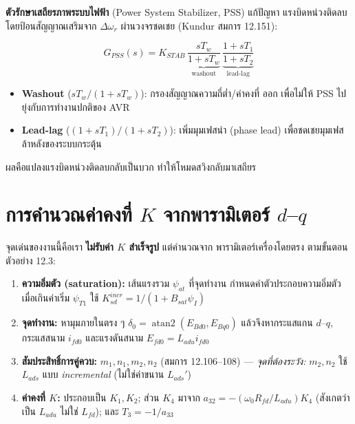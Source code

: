 \documentclass[12pt,a4paper]{article}
\newcommand{\dwr}{\Delta\omega_r}
\begin{document}
\textbf{ตัวรักษาเสถียรภาพระบบไฟฟ้า} (Power System Stabilizer, PSS) แก้ปัญหา
แรงบิดหน่วงติดลบ โดยป้อนสัญญาณเสริมจาก $\dwr$ ผ่านวงจรชดเชย (Kundur
สมการ 12.151):

\begin{equation}
G_{PSS}(s) = K_{STAB}\,
\underbrace{\frac{sT_w}{1+sT_w}}_{\text{washout}}\,
\underbrace{\frac{1+sT_1}{1+sT_2}}_{\text{lead-lag}}
\end{equation}

\begin{itemize}
  \item \textbf{Washout} ($sT_w/(1+sT_w)$): กรองสัญญาณความถี่ต่ำ/ค่าคงที่
        ออก เพื่อไม่ให้ PSS ไปยุ่งกับการทำงานปกติของ AVR
  \item \textbf{Lead-lag} ($(1+sT_1)/(1+sT_2)$): เพิ่มมุมเฟสนำ (phase lead)
        เพื่อชดเชยมุมเฟสล้าหลังของระบบกระตุ้น
\end{itemize}

ผลคือแปลงแรงบิดหน่วงติดลบกลับเป็นบวก ทำให้โหมดสวิงกลับมาเสถียร

\section{การคำนวณค่าคงที่ $K$ จากพารามิเตอร์ $d$--$q$}
\label{sec:kderiv}

จุดเด่นของงานนี้คือเรา \textbf{ไม่รับค่า $K$ สำเร็จรูป} แต่คำนวณจาก
พารามิเตอร์เครื่องโดยตรง ตามขั้นตอนตัวอย่าง 12.3:

\begin{enumerate}
  \item \textbf{ความอิ่มตัว (saturation):} เส้นแรงรวม $\psi_{at}$ ที่จุดทำงาน
        กำหนดค่าตัวประกอบความอิ่มตัว เมื่อเกินค่าเริ่ม $\psi_{T1}$ ใช้
        $K_{sd}^{incr} = 1/(1 + B_{sat}\psi_I)$
  \item \textbf{จุดทำงาน:} หามุมภายในตรง ๆ
        $\delta_0 = \operatorname{atan2}(E_{Bd0}, E_{Bq0})$ แล้วจึงหากระแสแกน
        $d$--$q$, กระแสสนาม $i_{fd0}$ และแรงดันสนาม $E_{fd0}=L_{adu}i_{fd0}$
  \item \textbf{สัมประสิทธิ์การคู่ควบ:} $m_1, n_1, m_2, n_2$ (สมการ
        12.106--108) --- \emph{จุดที่ต้องระวัง:} $m_2, n_2$ ใช้ $L_{ads}$
        แบบ \emph{incremental} (ไม่ใช่ค่าขนาน $L_{ads}'$)
  \item \textbf{ค่าคงที่ $K$:} ประกอบเป็น $K_1, K_2$; ส่วน $K_4$ มาจาก
        $a_{32} = -(\omega_0 R_{fd}/L_{adu})K_4$ (สังเกตว่าเป็น $L_{adu}$
        ไม่ใช่ $L_{fd}$); และ $T_3 = -1/a_{33}$
\end{enumerate}
\end{document}
